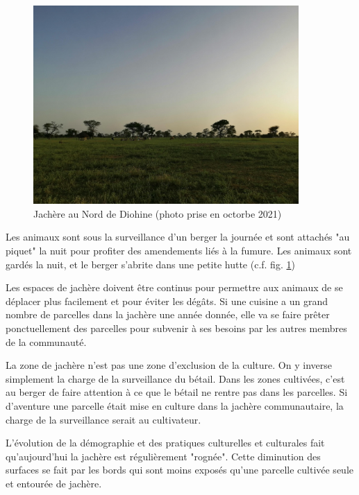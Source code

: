 \begin{figure}
  \begin{center}
    \includegraphics[width=0.9\textwidth]{img/jachere.jpg}
  \end{center}
  \caption{Jachère au Nord de Diohine (photo prise en octorbe 2021)}
  \label{fig:photoJachere}
\end{figure}



Les animaux sont  sous la surveillance d'un berger la journée et sont attachés "au piquet" la nuit pour profiter des amendements liés à la fumure. Les animaux sont gardés la nuit, et le berger s'abrite dans une petite hutte (c.f. fig. \ref{fig:photoJachere})

Les espaces de jachère doivent être continus pour permettre aux animaux de se déplacer plus facilement et pour éviter les dégâts. Si une cuisine a un grand nombre de parcelles dans la jachère une année donnée, elle va se faire prêter ponctuellement des parcelles pour subvenir à ses besoins par les autres membres de la communauté.

La zone de jachère n'est pas une zone d'exclusion de la culture. On y inverse simplement la charge de la surveillance du bétail. Dans les zones cultivées, c'est au berger de faire attention à ce que le bétail ne rentre pas dans les parcelles. Si d'aventure une parcelle était mise en culture dans la jachère communautaire, la charge de la surveillance serait au cultivateur.

L'évolution de la démographie et des pratiques culturelles et culturales fait qu'aujourd'hui la jachère est régulièrement "rognée". Cette diminution des surfaces se fait par les bords qui sont moins exposés qu'une parcelle cultivée seule et entourée de jachère.

